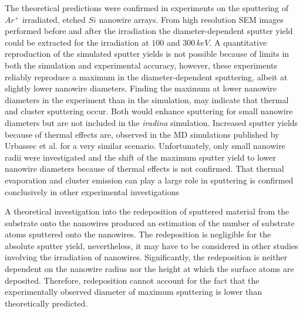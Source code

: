 The theoretical predictions were confirmed in experiments on the sputtering of $Ar^+$ irradiated, etched $Si$ nanowire arrays. From high resolution SEM images performed before and after the irradiation the diameter-dependent sputter yield could be extracted for the irradiation at $100$ and $300\,keV$. A quantitative reproduction of the simulated sputter yields is not possible because of limits in both the simulation and experimental accuracy, however, these experiments reliably reproduce a maximum in the diameter-dependent sputtering, albeit at slightly lower nanowire diameters. Finding the maximum at lower nanowire diameters in the experiment than in the simulation, may indicate that thermal and cluster sputtering occur. Both would enhance sputtering for small nanowire diameters but are not included in the \emph{iradina} simulation. Increased sputter yields because of thermal effects are, observed in the MD simulations published by Urbassec et al. \cite{urbassek_sputter_2015} for a very similar scenario. Unfortunately, only small nanowire radii were investigated and the shift of the maximum sputter yield to lower nanowire diameters because of thermal effects is not confirmed. That thermal evaporation and cluster emission can play a large role in sputtering is confirmed conclusively in other experimental investigations \cite{greaves_enhanced_2013,ilinov_sputtering_2014,anders_sputtering_2015,johannes_ion_2015}

A theoretical investigation into the redeposition of sputtered material from the substrate onto the nanowires produced an estimation of the number of substrate atoms sputtered onto the nanowires. The redeposition is negligible for the absolute sputter yield, nevertheless, it may have to be considered in other studies involving the irradiation of nanowires. Significantly, the redeposition is neither dependent on the nanowire radius nor the height at which the surface atoms are deposited. Therefore, redeposition cannot account for the fact that the experimentally observed diameter of maximum sputtering is lower than theoretically predicted.
